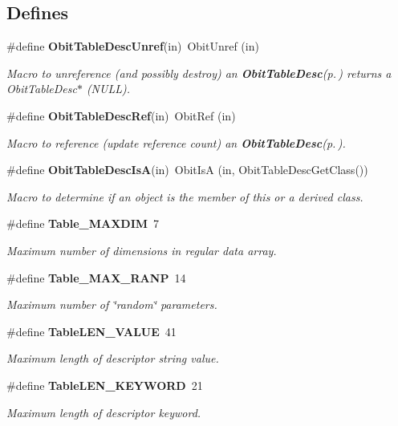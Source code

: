 \subsection*{Defines}
\begin{CompactItemize}
\item 
\#define {\bf Obit\-Table\-Desc\-Unref}(in)\ Obit\-Unref (in)
\begin{CompactList}\small\item\em Macro to unreference (and possibly destroy) an {\bf Obit\-Table\-Desc}{\rm (p.\,\pageref{structObitTableDesc})} returns a Obit\-Table\-Desc$\ast$ (NULL). \item\end{CompactList}\item 
\#define {\bf Obit\-Table\-Desc\-Ref}(in)\ Obit\-Ref (in)
\begin{CompactList}\small\item\em Macro to reference (update reference count) an {\bf Obit\-Table\-Desc}{\rm (p.\,\pageref{structObitTableDesc})}. \item\end{CompactList}\item 
\#define {\bf Obit\-Table\-Desc\-Is\-A}(in)\ Obit\-Is\-A (in, Obit\-Table\-Desc\-Get\-Class())
\begin{CompactList}\small\item\em Macro to determine if an object is the member of this or a derived class. \item\end{CompactList}\item 
\#define {\bf Table\_\-MAXDIM}\ 7
\begin{CompactList}\small\item\em Maximum number of dimensions in regular data array. \item\end{CompactList}\item 
\#define {\bf Table\_\-MAX\_\-RANP}\ 14
\begin{CompactList}\small\item\em Maximum number of \char`\"{}random\char`\"{} parameters. \item\end{CompactList}\item 
\#define {\bf Table\-LEN\_\-VALUE}\ 41
\begin{CompactList}\small\item\em Maximum length of descriptor string value. \item\end{CompactList}\item 
\#define {\bf Table\-LEN\_\-KEYWORD}\ 21
\begin{CompactList}\small\item\em Maximum length of descriptor keyword. \item\end{CompactList}\end{CompactItemize}
